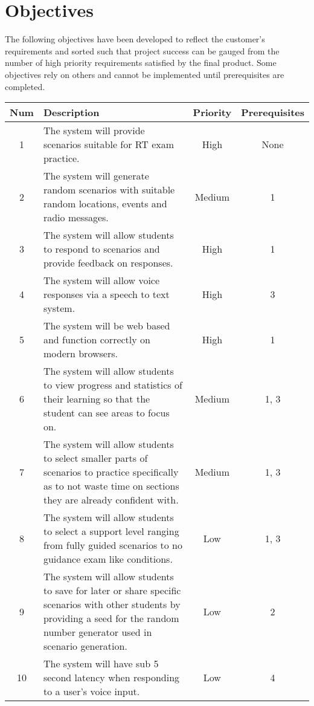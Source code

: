 \section{Objectives}
The following objectives have been developed to reflect the customer's requirements and sorted such that project success can be gauged from the number of high priority requirements satisfied by the final product. Some objectives rely on others and cannot be implemented until prerequisites are completed.

\begin{center}
    \begin{tabular}{ | c | m{24em} | c | c | }
        \hline
        \bf{Num} & \bf{Description} & \bf{Priority} & \bf{Prerequisites} \\
        \hline
        1 & The system will provide scenarios suitable for RT exam practice. & High & None \\
        \hline
        2 & The system will generate random scenarios with suitable random locations, events and radio messages. & Medium & 1 \\
        \hline
        3 & The system will allow students to respond to scenarios and provide feedback on responses. & High & 1 \\
        \hline
        4 & The system will allow voice responses via a speech to text system. & High & 3 \\
        \hline
        5 & The system will be web based and function correctly on modern browsers. & High & 1 \\
        \hline
        6 & The system will allow students to view progress and statistics of their learning so that the student can see areas to focus on. & Medium & 1, 3 \\
        \hline
        7 & The system will allow students to select smaller parts of scenarios to practice specifically as to not waste time on sections they are already confident with. & Medium & 1, 3 \\
        \hline
        8 & The system will allow students to select a support level ranging from fully guided scenarios to no guidance exam like conditions. & Low & 1, 3 \\
        \hline
        9 & The system will allow students to save for later or share specific scenarios with other students by providing a seed for the random number generator used in scenario generation. & Low & 2 \\
        \hline
        10 & The system will have sub 5 second latency when responding to a user's voice input. & Low & 4 \\
        \hline
    \end{tabular}
\end{center}